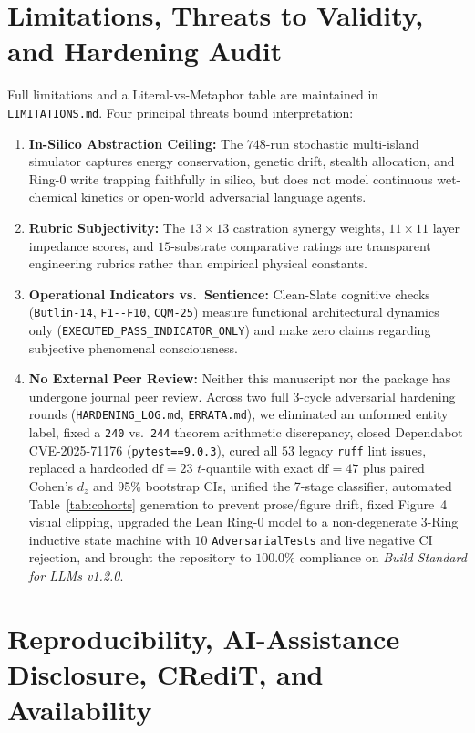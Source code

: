 \documentclass[11pt,reqno]{amsart}
\theoremstyle{plain}
\theoremstyle{definition}
\theoremstyle{remark}
\newcommand{\code}[1]{{\footnotesize\nolinkurl{#1}}}
\begin{document}
\section{Limitations, Threats to Validity, and Hardening Audit}
\label{sec:limitations}

Full limitations and a Literal-vs-Metaphor table are maintained in \code{LIMITATIONS.md}. Four principal threats bound interpretation:
\begin{enumerate}[leftmargin=1.5em]
  \item \textbf{In-Silico Abstraction Ceiling:} The $748$-run stochastic multi-island simulator captures energy conservation, genetic drift, stealth allocation, and Ring-0 write trapping faithfully in silico, but does not model continuous wet-chemical kinetics or open-world adversarial language agents.
  \item \textbf{Rubric Subjectivity:} The $13\times 13$ castration synergy weights, $11\times 11$ layer impedance scores, and $15$-substrate comparative ratings are transparent engineering rubrics rather than empirical physical constants.
  \item \textbf{Operational Indicators vs.\ Sentience:} Clean-Slate cognitive checks (\code{Butlin-14}, \code{F1--F10}, \code{CQM-25}) measure functional architectural dynamics only (\code{EXECUTED_PASS_INDICATOR_ONLY}) and make zero claims regarding subjective phenomenal consciousness.
  \item \textbf{No External Peer Review:} Neither this manuscript nor the package has undergone journal peer review. Across two full 3-cycle adversarial hardening rounds (\code{HARDENING_LOG.md}, \code{ERRATA.md}), we eliminated an unformed entity label, fixed a \code{240} vs.\ \code{244} theorem arithmetic discrepancy, closed Dependabot CVE-2025-71176 (\code{pytest==9.0.3}), cured all $53$ legacy \code{ruff} lint issues, replaced a hardcoded $\mathrm{df}=23$ $t$-quantile with exact $\mathrm{df}=47$ plus paired Cohen's $d_z$ and 95\% bootstrap CIs, unified the 7-stage classifier, automated Table~\ref{tab:cohorts} generation to prevent prose/figure drift, fixed Figure~4 visual clipping, upgraded the Lean Ring-0 model to a non-degenerate 3-Ring inductive state machine with $10$ \code{AdversarialTests} and live negative CI rejection, and brought the repository to $100.0\%$ compliance on \emph{Build Standard for LLMs v1.2.0}.
\end{enumerate}

\section{Reproducibility, AI-Assistance Disclosure, CRediT, and Availability}
\label{sec:repro}
\end{document}
